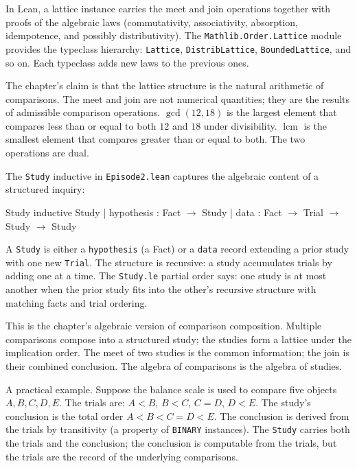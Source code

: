 In Lean, a lattice instance carries the meet and join operations
together with proofs of the algebraic laws (commutativity,
associativity, absorption, idempotence, and possibly distributivity).
The \texttt{Mathlib.Order.Lattice} module provides the typeclass
hierarchy: \texttt{Lattice}, \texttt{DistribLattice},
\texttt{BoundedLattice}, and so on. Each typeclass adds new laws to
the previous ones.

The chapter's claim is that the lattice structure is the natural
arithmetic of comparisons. The meet and join are not numerical
quantities; they are the results of admissible comparison operations.
$\gcd(12, 18)$ is the largest element that compares less than or
equal to both $12$ and $18$ under divisibility. $\operatorname{lcm}$
is the smallest element that compares greater than or equal to both.
The two operations are dual.

The \texttt{Study} inductive in \texttt{Episode2.lean} captures the
algebraic content of a structured inquiry:

\begin{leanexcerpt}{Study}
inductive Study
  | hypothesis : Fact $\to$ Study
  | data       : Fact $\to$ Trial $\to$ Study $\to$ Study
\end{leanexcerpt}

A \texttt{Study} is either a \texttt{hypothesis} (a Fact) or a \texttt{data}
record extending a prior study with one new \texttt{Trial}. The structure
is recursive: a study accumulates trials by adding one at a time. The
\texttt{Study.le} partial order says: one study is at most another when
the prior study fits into the other's recursive structure with matching
facts and trial ordering.

This is the chapter's algebraic version of comparison composition.
Multiple comparisons compose into a structured study; the studies
form a lattice under the implication order. The meet of two studies
is the common information; the join is their combined conclusion.
The algebra of comparisons is the algebra of studies.

A practical example. Suppose the balance scale is used to compare
five objects $A, B, C, D, E$. The trials are: $A < B$, $B < C$,
$C = D$, $D < E$. The study's conclusion is the total order $A < B
< C = D < E$. The conclusion is derived from the trials by
transitivity (a property of \texttt{BINARY} instances). The
\texttt{Study} carries both the trials and the conclusion; the
conclusion is computable from the trials, but the trials are the
record of the underlying comparisons.

